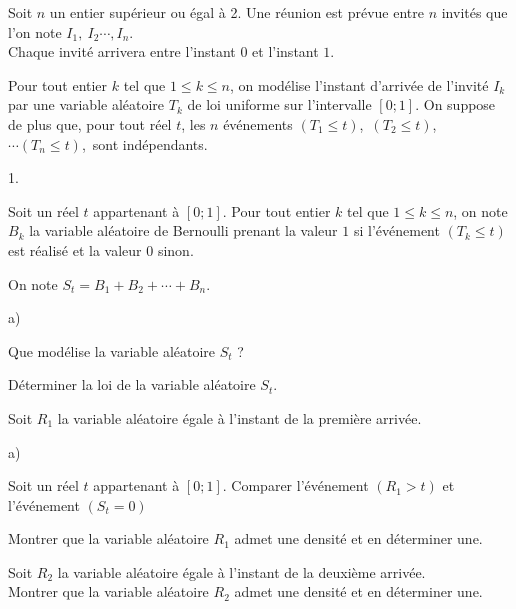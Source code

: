 \documentclass[11pt]{article}%
\begin{document}
Soit $n$ un entier supérieur ou égal à 2. Une réunion est prévue entre
$n$ invités que l'on note $I_{1},\ I_{2}\cdots,I_{n}$. 
\\
Chaque invité arrivera entre l'instant $0$ et l'instant $1$.

Pour tout entier $k$ tel que $1\leq k\leq n$, on modélise l'instant
d'arrivée de l'invité $I_{k}$ par une variable aléatoire $T_{k}$
de loi uniforme sur l'intervalle $\left[ 0;1\right] $. On suppose de
plus
que, pour tout réel $t$, les $n$ événements $\left( T_{1}\leq
t\right) $,\ $\left( T_{2}\leq t\right) $,\ $\cdots \left( T_{n}\leq
t\right) $,\ sont indépendants.

\begin{noliste}{1.}
 \setlength{\itemsep}{4mm}
\item Soit un réel $t$ appartenant à $\left[ 0;1\right] $. Pour tout
entier $k$ tel que $1\leq k\leq n$, on note $B_{k}$ la variable
aléatoire de Bernoulli prenant la valeur $1$ si l'événement $\left(
T_{k}\leq t\right) $ est réalisé et la valeur $0$ sinon.

On note $S_{t} = B_{1} + B_{2} + \cdots + B_{n}.$

\begin{noliste}{a)}
 \setlength{\itemsep}{2mm}
\item Que modélise la variable aléatoire $S_{t}$ ?

\item Déterminer la loi de la variable aléatoire $S_{t}$.
\end{noliste}

\item Soit $R_{1}$ la variable aléatoire égale à l'instant de la
première arrivée.

\begin{noliste}{a)}
 \setlength{\itemsep}{2mm}
\item Soit un réel $t$ appartenant à $\left[ 0;1\right] $. Comparer
l'événement $\left( R_{1}>t\right) $ et l'événement $\left(
S_{t} = 0\right) $

\item Montrer que la variable aléatoire $R_{1}$ admet une densité et
en déterminer une.
\end{noliste}

\item Soit $R_{2}$ la variable aléatoire égale à l'instant de la
deuxième arrivée.\\
Montrer que la variable aléatoire $R_{2}$ admet une densité et en
déterminer une.
\end{noliste}
\end{document}
